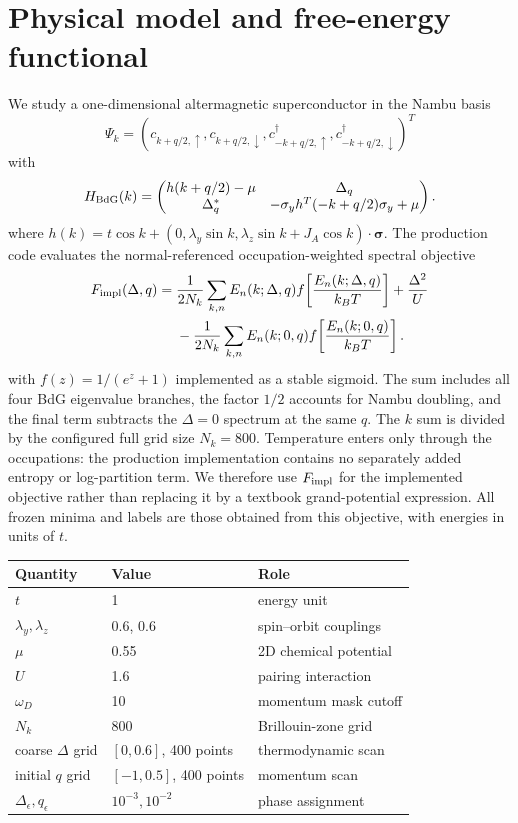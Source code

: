 \section{Physical model and free-energy functional}\label{sec:model}
We study a one-dimensional altermagnetic superconductor in the Nambu basis
\[\Psi_k=(c_{k+q/2,\uparrow},c_{k+q/2,\downarrow},c^\dagger_{-k+q/2,\uparrow},c^\dagger_{-k+q/2,\downarrow})^T\] with
\begin{equation}
H_{\rm BdG}(k)=\begin{pmatrix}h(k+q/2)-\mu&\Delta_q\\ \Delta_q^*&-\sigma_y h^T(-k+q/2)\sigma_y+\mu\end{pmatrix}.
\end{equation}
where $h(k)=t\cos k+(0,\lambda_y\sin k,\lambda_z\sin k+J_A\cos k)\cdot\boldsymbol\sigma$.
The production code evaluates the normal-referenced occupation-weighted spectral objective
\begin{align}
F_{\rm impl}(\Delta,q)={}&\frac{1}{2N_k}\sum_{k,n}E_n(k;\Delta,q)
f\!\left[\frac{E_n(k;\Delta,q)}{k_BT}\right]+\frac{\Delta^2}{U}\notag\\
&-\frac{1}{2N_k}\sum_{k,n}E_n(k;0,q)
f\!\left[\frac{E_n(k;0,q)}{k_BT}\right].
\end{align}
with $f(z)=1/(e^z+1)$ implemented as a stable sigmoid.  The sum includes all four BdG eigenvalue branches, the factor $1/2$ accounts for Nambu doubling, and the final term subtracts the $\Delta=0$ spectrum at the same $q$.  The $k$ sum is divided by the configured full grid size $N_k=800$.  Temperature enters only through the occupations: the production implementation contains no separately added entropy or log-partition term.  We therefore use $F_{\rm impl}$ for the implemented objective rather than replacing it by a textbook grand-potential expression.  All frozen minima and labels are those obtained from this objective, with energies in units of $t$.

\begin{AnchoredTable}\caption{Physical and numerical parameters.}\label{tab:s1}\centering
\begin{tabular}{lll}\toprule Quantity & Value & Role\\\midrule
$t$ & 1 & energy unit\\ $\lambda_y,\lambda_z$ & 0.6, 0.6 & spin--orbit couplings\\ $\mu$ & 0.55 & 2D chemical potential\\ $U$ & 1.6 & pairing interaction\\ $\omega_D$ & 10 & momentum mask cutoff\\ $N_k$ & 800 & Brillouin-zone grid\\ coarse $\Delta$ grid & $[0,0.6]$, 400 points & thermodynamic scan\\ initial $q$ grid & $[-1,0.5]$, 400 points & momentum scan\\ $\Delta_\epsilon,q_\epsilon$ & $10^{-3},10^{-2}$ & phase assignment\\\bottomrule\end{tabular}\end{AnchoredTable}

